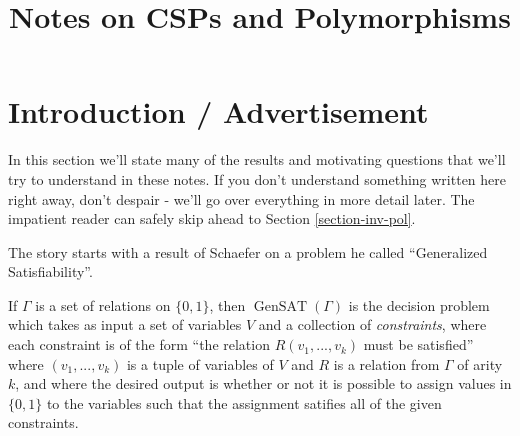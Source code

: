 \documentclass[letterpaper,11pt]{article}
\DeclareMathOperator{\GenSAT}{GenSAT}
\begin{document}
\newcommand{\fp}{\mathfrak{p}}

\newcommand{\dotcup}{\ensuremath{\mathaccent\cdot\cup}}

\newcommand{\rvline}{\hspace*{-\arraycolsep}\vline\hspace*{-\arraycolsep}}

\title{Notes on CSPs and Polymorphisms}
\date{}
\author{}
\maketitle

\tableofcontents

\section{Introduction / Advertisement}

In this section we'll state many of the results and motivating questions that we'll try to understand in these notes. If you don't understand something written here right away, don't despair - we'll go over everything in more detail later. The impatient reader can safely skip ahead to Section \ref{section-inv-pol}.

The story starts with a result of Schaefer \cite{schaefer} on a problem he called ``Generalized Satisfiability''.

\begin{defn} If $\Gamma$ is a set of relations on $\{0,1\}$, then $\GenSAT(\Gamma)$ is the decision problem which takes as input a set of variables $V$ and a collection of \emph{constraints}, where each constraint is of the form ``the relation $R(v_1, ..., v_k)$ must be satisfied'' where $(v_1, ..., v_k)$ is a tuple of variables of $V$ and $R$ is a relation from $\Gamma$ of arity $k$, and where the desired output is whether or not it is possible to assign values in $\{0,1\}$ to the variables such that the assignment satifies all of the given constraints.
\end{defn}
\end{document}

